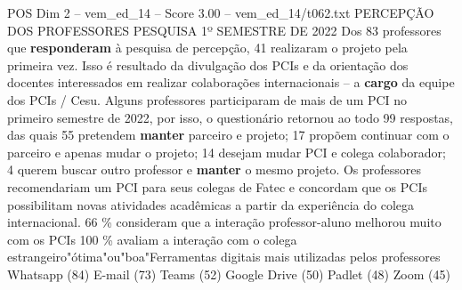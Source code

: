 \begin{textsample}{POS Dim 2 – vem\_ed\_14 – Score 3.00 – vem\_ed\_14/t062.txt}  \label{ex:f2_pos_120}
PERCEPÇÃO DOS PROFESSORES PESQUISA 1º SEMESTRE DE 2022 Dos 83 professores que \textbf{responderam} à pesquisa de percepção, 41 realizaram o projeto pela primeira vez.
Isso é resultado da divulgação dos PCIs e da orientação dos docentes interessados em realizar colaborações internacionais – a \textbf{cargo} da equipe dos PCIs / Cesu.
Alguns professores participaram de mais de um PCI no primeiro semestre de 2022, por isso, o questionário retornou ao todo 99 respostas, das quais 55 pretendem \textbf{manter} parceiro e projeto; 17 propõem continuar com o parceiro e apenas mudar o projeto; 14 desejam mudar PCI e colega colaborador; 4 querem buscar outro professor e \textbf{manter} o mesmo projeto.
Os professores recomendariam um PCI para seus colegas de Fatec e concordam que os PCIs possibilitam novas atividades acadêmicas a partir da experiência do colega internacional. 66 \% consideram que a interação professor-aluno melhorou muito com os PCIs 100 \% avaliam a interação com o colega estrangeiro"ótima"ou"boa"Ferramentas digitais mais utilizadas pelos professores Whatsapp (84) E-mail (73) Teams (52) Google Drive (50) Padlet (48) Zoom (45)

\end{textsample}
